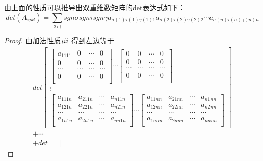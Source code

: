 \documentclass[twoside,a4paper,CCT]{cctart}   %
\begin{document}
\begin{theorem} 由上面的性质可以推导出双重维数矩阵的det表达式如下：
$$det(A_{ijkl})=\sum \limits_{\sigma\tau\gamma}sgn\sigma sgn\tau sgn\gamma a_{\sigma(1)\tau(1)\gamma(1)1} a_{\sigma(2)\tau(2)\gamma(2)2}\cdots a_{\sigma(n)\tau(n)\gamma(n)n}$$
\end{theorem}
\begin{proof}
由加法性质$\uppercase\expandafter{\romannumeral3}$ 得到左边等于
 \begin{equation}
 \begin{aligned}
det\begin{bmatrix}
  \begin{bmatrix}
   a_{1111}& 0&\cdots&0\\
   0& 0&\cdots&0\\
  \cdots& \cdots&\cdots&\cdots \\
0& 0&\cdots&0\\
\end{bmatrix}
\cdots
 \begin{bmatrix}
   0& 0&\cdots&0\\
   0& 0&\cdots&0\\
  \cdots& \cdots&\cdots&\cdots \\
0& 0&\cdots&0\\
\end{bmatrix}\\
\vdots\\
\begin{bmatrix}
  a_{111n}& a_{211n}&\cdots&a_{n11n}\\
  a_{121n}& a_{221n}&\cdots&a_{n21n}\\
  \cdots& \cdots&\cdots&\cdots \\
  a_{1n1n}& a_{2n1n}&\cdots&a_{nn1n}\\
  \end{bmatrix}
\cdots
\begin{bmatrix}
  a_{11nn}& a_{21nn}&\cdots&a_{n1nn}\\
  a_{12nn}& a_{22nn}&\cdots&a_{n2nn}\\
  \cdots& \cdots&\cdots&\cdots \\
   a_{1nnn}& a_{2nnn}&\cdots&a_{nnnn}\\
\end{bmatrix}
\end{bmatrix}\\
+ \cdots\\
+det\begin{bmatrix}

\end{bmatrix}
\end{aligned}
\end{equation}
\end{proof}
\end{document}
